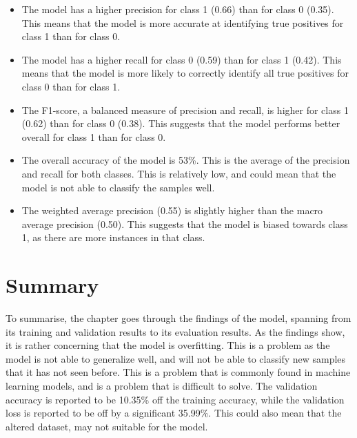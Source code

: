 \begin{itemize}
    \item The model has a higher precision for class 1 (0.66) than for class 0 (0.35). This means that the model is more accurate at identifying true positives for class 1 than for class 0.
    \item The model has a higher recall for class 0 (0.59) than for class 1 (0.42). This means that the model is more likely to correctly identify all true positives for class 0 than for class 1.
    \item The F1-score, a balanced measure of precision and recall, is higher for class 1 (0.62) than for class 0 (0.38). This suggests that the model performs better overall for class 1 than for class 0.
    \item The overall accuracy of the model is 53\%. This is the average of the precision and recall for both classes. This is relatively low, and could mean that the model is not able to classify the samples well.
    \item The weighted average precision (0.55) is slightly higher than the macro average precision (0.50). This suggests that the model is biased towards class 1, as there are more instances in that class.
\end{itemize}

\newpage
\section{Summary}
To summarise, the chapter goes through the findings of the model, spanning from its training and validation results to its evaluation results. As the findings show, it is rather concerning that the model is overfitting. This is a problem as the model is not able to generalize well, and will not be able to classify new samples that it has not seen before. This is a problem that is commonly found in machine learning models, and is a problem that is difficult to solve. The validation accuracy is reported to be 10.35\% off the training accuracy, while the validation loss is reported to be off by a significant 35.99\%. This could also mean that the altered dataset, may not suitable for the model.




















